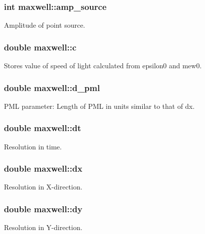 \subsubsection[{\texorpdfstring{amp\+\_\+source}{amp_source}}]{\setlength{\rightskip}{0pt plus 5cm}int maxwell\+::amp\+\_\+source}\hypertarget{classmaxwell_a3b319987a65dc17fcf8e384cdc131fc7}{}\label{classmaxwell_a3b319987a65dc17fcf8e384cdc131fc7}
Amplitude of point source. 
\subsubsection[{\texorpdfstring{c}{c}}]{\setlength{\rightskip}{0pt plus 5cm}double maxwell\+::c}\hypertarget{classmaxwell_a3d7831352c618e863583d1b20965f8f7}{}\label{classmaxwell_a3d7831352c618e863583d1b20965f8f7}
Stores value of speed of light calculated from \textquotesingle{}epsilon0\textquotesingle{} and \textquotesingle{}mew0\textquotesingle{}. 
\subsubsection[{\texorpdfstring{d\+\_\+pml}{d_pml}}]{\setlength{\rightskip}{0pt plus 5cm}double maxwell\+::d\+\_\+pml}\hypertarget{classmaxwell_ac0d3b422db5ba08a7fac2d32c408f6a9}{}\label{classmaxwell_ac0d3b422db5ba08a7fac2d32c408f6a9}
P\+ML parameter\+: Length of P\+ML in units similar to that of dx. 
\subsubsection[{\texorpdfstring{dt}{dt}}]{\setlength{\rightskip}{0pt plus 5cm}double maxwell\+::dt}\hypertarget{classmaxwell_ab01332ef8711870bd42210b8504eb08b}{}\label{classmaxwell_ab01332ef8711870bd42210b8504eb08b}
Resolution in time. 
\subsubsection[{\texorpdfstring{dx}{dx}}]{\setlength{\rightskip}{0pt plus 5cm}double maxwell\+::dx}\hypertarget{classmaxwell_aa12ffa3f8fdf5b3b6b178791ef7bb3bb}{}\label{classmaxwell_aa12ffa3f8fdf5b3b6b178791ef7bb3bb}
Resolution in X-\/direction. 
\subsubsection[{\texorpdfstring{dy}{dy}}]{\setlength{\rightskip}{0pt plus 5cm}double maxwell\+::dy}\hypertarget{classmaxwell_a66a88a9d7d85c0f017f6dc74c3423a68}{}\label{classmaxwell_a66a88a9d7d85c0f017f6dc74c3423a68}
Resolution in Y-\/direction. 
